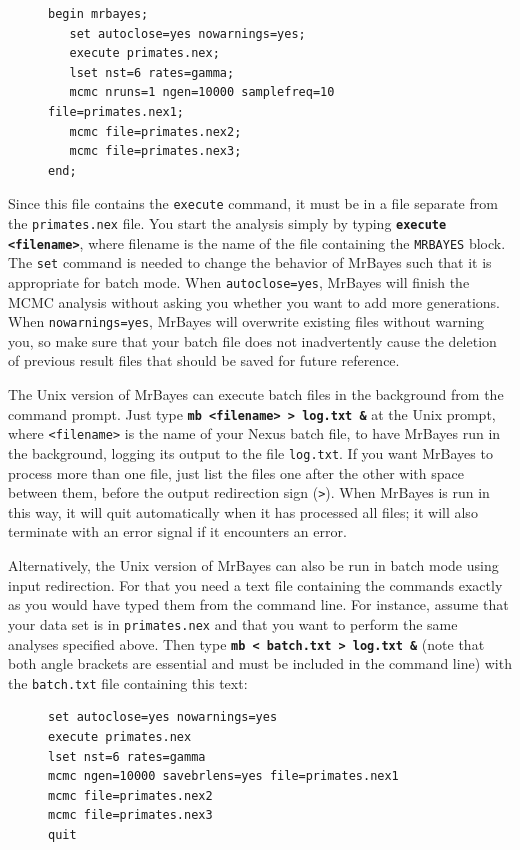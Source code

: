 \documentclass[12pt]{book}
\newcommand{\ttt}[1]{\texttt{#1}}
\newcommand{\tb}[1]{\ttt{\textbf{#1}}}
\begin{document}
\begin{figure}[h]
\centering
\begin{BVerbatim}[fontsize=\small]
begin mrbayes;
   set autoclose=yes nowarnings=yes;
   execute primates.nex;
   lset nst=6 rates=gamma;
   mcmc nruns=1 ngen=10000 samplefreq=10 file=primates.nex1;
   mcmc file=primates.nex2;
   mcmc file=primates.nex3;
end;
\end{BVerbatim}
\end{figure}

Since this file contains the \texttt{execute} command, it must be in a file separate from the
\texttt{primates.nex} file. You start the analysis simply by typing \tb{execute <filename>}, where
filename is the name of the file containing the \texttt{MRBAYES} block. The \texttt{set} command is
needed to change the behavior of MrBayes such that it is appropriate for batch mode. When
\texttt{autoclose=yes}, MrBayes will finish the MCMC analysis without asking you whether you want
to add more generations. When \texttt{nowarnings=yes}, MrBayes will overwrite existing files
without warning you, so make sure that your batch file does not inadvertently cause the deletion of
previous result files that should be saved for future reference.

The Unix version of MrBayes can execute batch files in the background from the command prompt. Just
type \tb{mb <filename> > log.txt \&} at the Unix prompt, where \texttt{<filename>} is the name of your
Nexus batch file, to have MrBayes run in the background, logging its output to the file
\texttt{log.txt}. If you want MrBayes to process more than one file, just list the files one after
the other with space between them, before the output redirection sign (\texttt{>}). When MrBayes is
run in this way, it will quit automatically when it has processed all files; it will also terminate
with an error signal if it encounters an error.

Alternatively, the Unix version of MrBayes can also be run in batch mode using input redirection.
For that you need a text file containing the commands exactly as you would have typed them from the
command line. For instance, assume that your data set is in \texttt{primates.nex} and that you want
to perform the same analyses specified above. Then type \tb{mb < batch.txt > log.txt \&} (note that
both angle brackets are essential and must be included in the command line) with the
\texttt{batch.txt} file containing this text:

\begin{figure}[h]
\centering
\begin{BVerbatim}[fontsize=\small]
set autoclose=yes nowarnings=yes
execute primates.nex
lset nst=6 rates=gamma
mcmc ngen=10000 savebrlens=yes file=primates.nex1
mcmc file=primates.nex2
mcmc file=primates.nex3
quit
\end{BVerbatim}
\end{figure}
\end{document}
